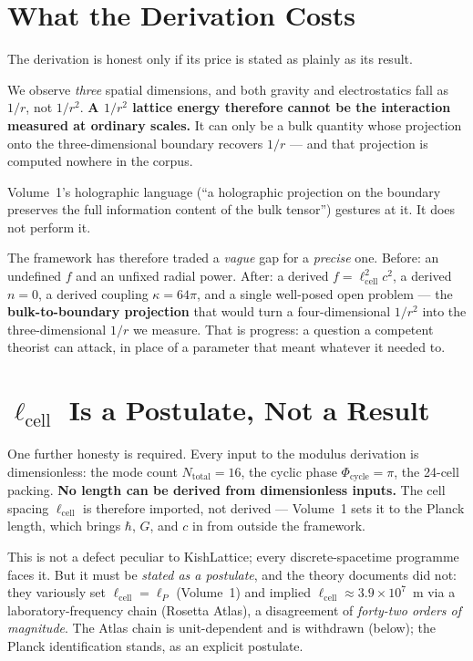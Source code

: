 \documentclass[11pt, letterpaper, openany]{book}
\begin{document}
\section{What the Derivation Costs}

The derivation is honest only if its price is stated as plainly as its result.

\begin{warningbox}
We observe \emph{three} spatial dimensions, and both gravity and electrostatics fall as $1/r$, not
$1/r^2$. \textbf{A $1/r^2$ lattice energy therefore cannot be the interaction measured at ordinary
scales.} It can only be a bulk quantity whose projection onto the three-dimensional boundary
recovers $1/r$ --- and that projection is computed nowhere in the corpus.

\medskip
Volume~1's holographic language (``a holographic projection on the boundary preserves the full
information content of the bulk tensor'') gestures at it. It does not perform it.
\end{warningbox}

\begin{signalbox}
The framework has therefore traded a \emph{vague} gap for a \emph{precise} one. Before: an undefined
$f$ and an unfixed radial power. After: a derived $f = \ell_{\mathrm{cell}}^2 c^2$, a derived
$n = 0$, a derived coupling $\kappa = 64\pi$, and a single well-posed open problem --- the
\textbf{bulk-to-boundary projection} that would turn a four-dimensional $1/r^2$ into the
three-dimensional $1/r$ we measure. That is progress: a question a competent theorist can attack,
in place of a parameter that meant whatever it needed to.
\end{signalbox}

\section{$\ell_{\mathrm{cell}}$ Is a Postulate, Not a Result}

One further honesty is required. Every input to the modulus derivation is dimensionless: the mode
count $N_{\mathrm{total}} = 16$, the cyclic phase $\Phi_{\mathrm{cycle}} = \pi$, the 24-cell packing.
\textbf{No length can be derived from dimensionless inputs.} The cell spacing
$\ell_{\mathrm{cell}}$ is therefore imported, not derived --- Volume~1 sets it to the Planck length,
which brings $\hbar$, $G$, and $c$ in from outside the framework.

This is not a defect peculiar to KishLattice; every discrete-spacetime programme faces it. But it
must be \emph{stated as a postulate}, and the theory documents did not: they variously set
$\ell_{\mathrm{cell}} = \ell_P$ (Volume~1) and implied $\ell_{\mathrm{cell}} \approx 3.9\times10^{7}$~m
via a laboratory-frequency chain (Rosetta Atlas), a disagreement of \emph{forty-two orders of
magnitude}. The Atlas chain is unit-dependent and is withdrawn (below); the Planck identification
stands, as an explicit postulate.
\end{document}
